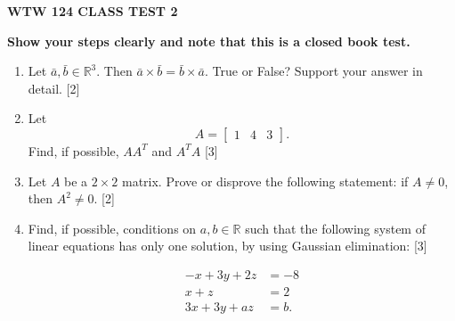 \documentclass[11pt]{article}
\begin{document}
\begin{center}
    \textbf{\large WTW 124 \hfill CLASS TEST 2}
\end{center}

\textbf{Show your steps clearly and note that this is a closed book test.}

\begin{enumerate}
    \item Let \(\bar{a},\bar{b} \in \mathbb{R}^3\). Then \(\bar{a}\times\bar{b} =\bar{b}\times\bar{a} \). True or False?
    Support your answer in detail. \hfill [2]
    \vspace{8cm}
    \item Let \[A = \begin{bmatrix} 1 & 4 & 3 \end{bmatrix}.\]
    Find, if possible, \(AA^T\) and \(A^TA\) \hfill [3]
    \vspace{8cm}
    \item Let \(A\) be a \(2\times2\) matrix. Prove or disprove the following statement:
    if \(A\neq 0\), then \(A^2 \neq 0\). \hfill [2]
    \newpage
    \item Find, if possible, conditions on \(a,b\in \mathbb{R}\) such that the following system of linear equations
    has only one solution, by using Gaussian elimination: \hfill [3]

    \[
    \begin{aligned}
        -x+3y+2z &= -8\\
        x+z &= 2\\
        3x+3y+az &= b.
    \end{aligned}
    \]
\end{enumerate}
\end{document}
